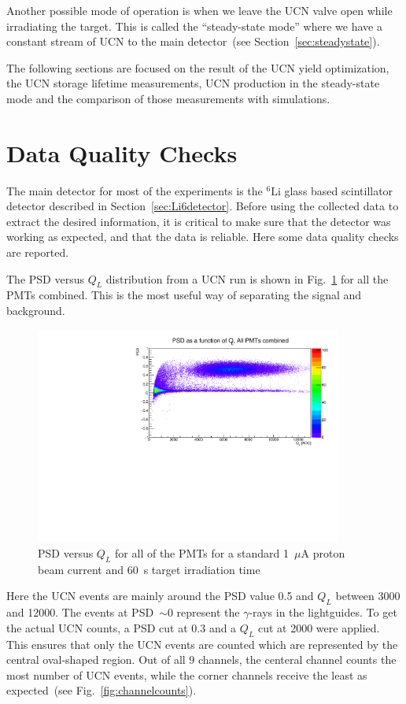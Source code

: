 Another possible mode of operation is when we leave the UCN valve open
while irradiating the target. This is called the ``steady-state
mode'' where we have a constant stream of UCN to the main
detector~(see Section~\ref{sec:steadystate}).

The following sections are focused on the result of the UCN yield
optimization, the UCN storage lifetime measurements, UCN production in
the steady-state mode and the comparison of those measurements with
simulations.


\section {Data Quality Checks}
The main detector for most of the experiments is the $^6\mathrm{Li}$
glass based scintillator detector described in
Section~\ref{sec:Li6detector}. Before using the collected data to
extract the desired information, it is critical to make sure that the
detector was working as expected, and that the data is reliable. Here
some data quality checks are reported.


The PSD versus $Q_L$ distribution from a UCN run is shown in
Fig.~\ref{fig:psd_vs_ql} for all the PMTs combined. This is the most
useful way of separating the signal and background.
\begin{figure}[h!]
  \centering
  \includegraphics[width=0.9\textwidth]{PSD_vs_QL.pdf}
  \caption{PSD versus $Q_L$ for all of the PMTs for a standard
    1~$\mu$A proton beam current and 60~s target irradiation time }
  \label{fig:psd_vs_ql}
\end{figure}
Here the UCN events are mainly around the PSD value 0.5 and $Q_L$
between 3000 and 12000. The events at PSD~$\sim 0$ represent the
$\gamma$-rays in the lightguides. To get the actual UCN counts, a PSD
cut at 0.3 and a $Q_L$ cut at 2000 were applied. This ensures that
only the UCN events are counted which are represented by the central
oval-shaped region. Out of all 9 channels, the centeral channel counts
the most number of UCN events, while the corner channels receive the
least as expected~(see Fig.~\ref{fig:channelcounts}).

